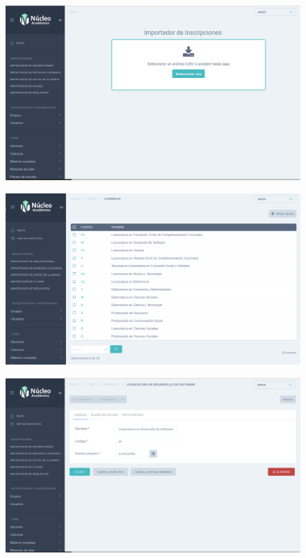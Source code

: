 \begin{figure}[!htbp]
  \centering
    \includegraphics[scale=0.3]{images/nucleo/nucleo-importador.png}
  \label{fig:nucleo-importador}
\end{figure}

\begin{figure}[!htbp]
  \centering
    \includegraphics[scale=0.3]{images/nucleo/nucleo-list.png}
  \label{fig:nucleo-listado}
\end{figure}

\begin{figure}[!htbp]
  \centering
    \includegraphics[scale=0.3]{images/nucleo/nucleo-edit.png}
  \label{fig:nucleo-edicion}
\end{figure}

